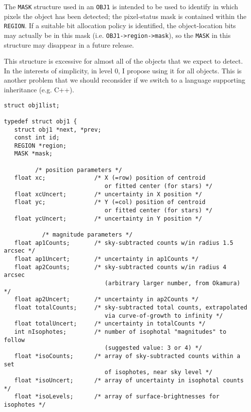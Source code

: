 {\begin{itemize}
The {\tt MASK} structure used in an {\tt OBJ1} is intended to be used
to identify in which pixels the object has been detected; the pixel-status
mask is contained within the {\tt REGION}. If a suitable bit allocation
policy is identified, the object-location bits may actually be in this
mask (i.e. {\tt OBJ1->region->mask}), so the {\tt MASK} in this structure
may disappear in a future release.

This structure is excessive for almost all of the objects that we expect
to detect. In the interests of simplicity, in level 0, I propose using
it for all objects. This is another problem that we should reconsider
if we switch to a language supporting inheritance (e.g. C++).

\begin{verbatim}
struct obj1list;

typedef struct obj1 {
   struct obj1 *next, *prev;
   const int id;
   REGION *region;
   MASK *mask;

         /* position parameters */
   float xc;              /* X (=row) position of centroid 
                             or fitted center (for stars) */
   float xcUncert;        /* uncertainty in X position */
   float yc;              /* Y (=col) position of centroid
                             or fitted center (for stars) */
   float ycUncert;        /* uncertainty in Y position */

           /* magnitude parameters */
   float ap1Counts;       /* sky-subtracted counts w/in radius 1.5 arcsec */
   float ap1Uncert;       /* uncertainty in ap1Counts */
   float ap2Counts;       /* sky-subtracted counts w/in radius 4 arcsec
                             (arbitrary larger number, from Okamura) */
   float ap2Uncert;       /* uncertainty in ap2Counts */
   float totalCounts;     /* sky-subtracted total counts, extrapolated
                             via curve-of-growth to infinity */
   float totalUncert;     /* uncertainty in totalCounts */
   int nIsophotes;        /* number of isophotal "magnitudes" to follow
                             (suggested value: 3 or 4) */
   float *isoCounts;      /* array of sky-subtracted counts within a set
                             of isophotes, near sky level */
   float *isoUncert;      /* array of uncertainty in isophotal counts */
   float *isoLevels;      /* array of surface-brightnesses for isophotes */


\end{verbatim}
\end{itemize}}
